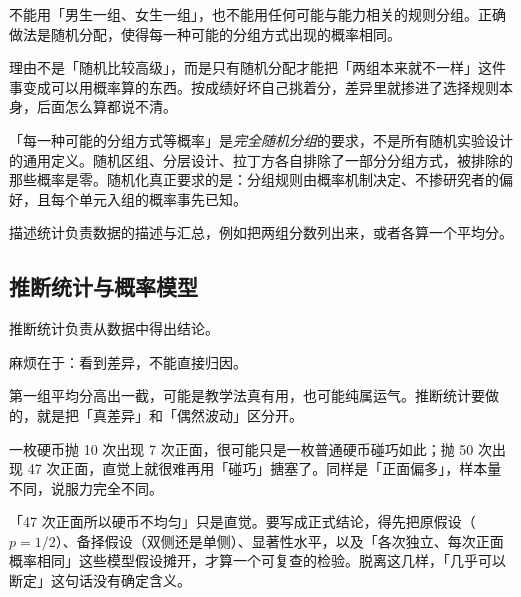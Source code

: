 \begin{proposition}[分组必须随机分配]
不能用「男生一组、女生一组」，也不能用任何可能与能力相关的规则分组。正确做法是随机分配，使得每一种可能的分组方式出现的概率相同。
\end{proposition}

理由不是「随机比较高级」，而是只有随机分配才能把「两组本来就不一样」这件事变成可以用概率算的东西。按成绩好坏自己挑着分，差异里就掺进了选择规则本身，后面怎么算都说不清。

\begin{remark}
「每一种可能的分组方式等概率」是\emph{完全随机分组}的要求，不是所有随机实验设计的通用定义。随机区组、分层设计、拉丁方各自排除了一部分分组方式，被排除的那些概率是零。随机化真正要求的是：分组规则由概率机制决定、不掺研究者的偏好，且每个单元入组的概率事先已知。
\end{remark}

\begin{definition}[描述统计]
描述统计负责数据的描述与汇总，例如把两组分数列出来，或者各算一个平均分。
\end{definition}

\subsection{推断统计与概率模型}

\begin{definition}[推断统计]
推断统计负责从数据中得出结论。
\end{definition}

麻烦在于：看到差异，不能直接归因。

\begin{proposition}[差异可能只是偶然]
第一组平均分高出一截，可能是教学法真有用，也可能纯属运气。推断统计要做的，就是把「真差异」和「偶然波动」区分开。
\end{proposition}

\begin{example}[硬币]
一枚硬币抛 10 次出现 7 次正面，很可能只是一枚普通硬币碰巧如此；抛 50 次出现 47 次正面，直觉上就很难再用「碰巧」搪塞了。同样是「正面偏多」，样本量不同，说服力完全不同。
\end{example}

\begin{remark}[直觉结论和推断结论不是一回事]
「47 次正面所以硬币不均匀」只是直觉。要写成正式结论，得先把原假设（$p=1/2$）、备择假设（双侧还是单侧）、显著性水平，以及「各次独立、每次正面概率相同」这些模型假设摊开，才算一个可复查的检验。脱离这几样，「几乎可以断定」这句话没有确定含义。
\end{remark}

